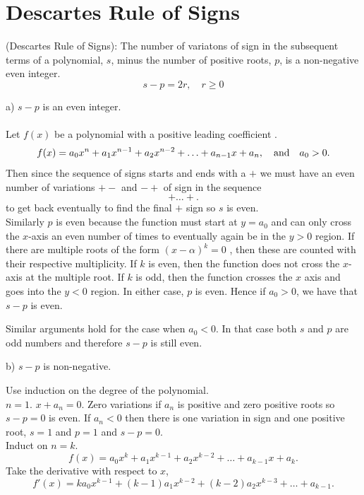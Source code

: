 \section{Descartes Rule of Signs}

\begin{theorem}{(Descartes Rule of Signs):}
The number of variatons of sign in the subsequent terms of a polynomial, $s$, minus the number of positive roots, $p$, is a non-negative even integer.\\
$$s-p = 2r, \quad r\ge 0$$ 
\end{theorem}


a) $s-p$ is an even integer.\\ \\
Let $f(x)$ be a polynomial with a positive leading coefficient . \[ f(x) = a_0 x^n + a_1 x^{n-1} + a_2 x^{n-2} + \hdots + a_{n-1} x + a_n, \quad \hbox{and~~~}  a_0 > 0. \]
Then since the sequence of signs starts and ends with a $+$ we must have an even number of variations $+-$ and $-+$ of sign in the sequence $$+\hdots+.$$ to get back eventually to find the final $+$ sign so $s$ is even.\\

Similarly $p$ is even because the function must start at $y=a_0$ and can only cross the $x$-axis an even number of times to eventually again be in the $y>0$ region. If there are multiple roots of the form $(x-\alpha)^k = 0$ , then these are counted with their respective multiplicity. If $k$ is even, then the function does not cross the $x$-axis at the multiple root. If $k$ is odd, then the function crosses the $x$ axis and goes into the $y<0$ region. In either case, $p$ is even. Hence if $a_0 > 0$, we have that $s-p$ is even. 

Similar arguments hold for the case when $a_0<0$. In that case both $s$ and $p$ are odd numbers and therefore $s-p$ is still even.  


b) $s-p$ is non-negative. 

Use induction on the degree of the polynomial.\\
$n=1$. $x + a_n = 0$. Zero variations if $a_n$ is positive and zero positive roots so $s-p = 0$ is even. If $a_n < 0$ then there is one variation in sign and one positive root, $s=1$ and $p=1$ and $s-p=0$.\\

Induct on $n = k$.  \[ f(x) = a_0 x^k + a_1 x^{k-1} + a_2 x^{k-2} + \hdots + a_{k-1} x + a_k. \] Take the derivative with respect to $x$,
\[ f'(x) = ka_0 x^{k-1} + (k-1)a_1 x^{k-2} + (k-2)a_2 x^{k-3} + \hdots + a_{k-1}.\] 

